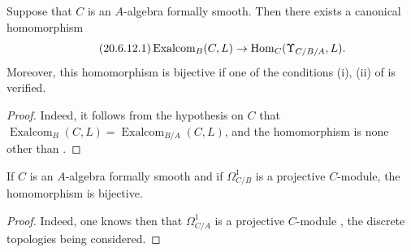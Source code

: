 \begin{corollary}[20.6.12]
\label{0.20.6.12}
Suppose that $C$ is an $A$-algebra formally smooth.
Then there exists a canonical homomorphism
\begin{equation}
\tag{20.6.12.1}
  \label{0.20.6.12.1}
  \operatorname{Exalcom}_B(C,L)\to\operatorname{Hom}_C(\Upsilon_{C/B/A},L).
\end{equation}
Moreover, this homomorphism is bijective if one of the conditions \textup{(i)}, \textup{(ii)} of  is verified.
\end{corollary}

\begin{proof}
Indeed, it follows from the hypothesis on $C$ that $\operatorname{Exalcom}_B(C,L)=\operatorname{Exalcom}_{B/A}(C,L)$, and the homomorphism  is none other than .
\end{proof}

\begin{corollary}[20.6.13]
\label{0.20.6.13}
If $C$ is an $A$-algebra formally smooth and if $\Omega^1_{C/B}$ is a projective $C$-module, the homomorphism  is bijective.
\end{corollary}

\begin{proof}
Indeed, one knows then that $\Omega^1_{C/A}$ is a projective $C$-module , the discrete topologies being considered.
\end{proof}

